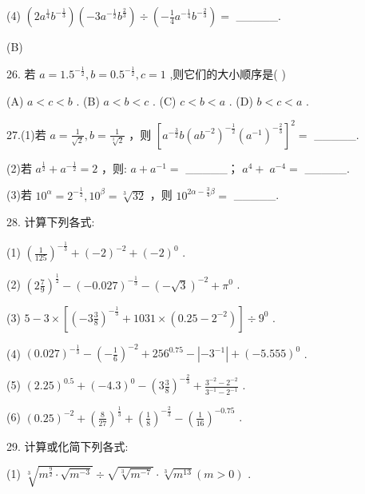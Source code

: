 \documentclass[10pt]{article}
\newcommand*\circled[1]{\tikz[baseline=(char.base)]{\node[shape=circle,draw,inner sep=1.5pt] (char) {\small #1};}}
\begin{document}
(4) \(\left( {{2{a}^{\frac{1}{4}}}{b}^{-\frac{1}{3}}}\right) \left( {-3{a}^{-\frac{1}{2}}{b}^{\frac{2}{3}}}\right)  \div  \left( {-\frac{1}{4}{a}^{-\frac{1}{4}}{b}^{-\frac{2}{3}}}\right)  =\) \_\_\_\_\_.

(B)

26. 若 \(a = {1.5}^{-\frac{1}{2}},b = {0.5}^{-\frac{1}{2}},c = 1\) ,则它们的大小顺序是( )

(A) \(a < c < b\) . (B) \(a < b < c\) . (C) \(c < b < a\) . (D) \(b < c < a\) .

27.(1)若 \(a = \frac{1}{\sqrt{2}},b = \frac{1}{\sqrt[3]{2}}\) ，则 \({\left\lbrack  {a}^{-\frac{3}{2}}b{\left( a{b}^{-2}\right) }^{-\frac{1}{2}}{\left( {a}^{-1}\right) }^{-\frac{2}{3}}\right\rbrack  }^{2} =\) \_\_\_\_\_.

(2)若 \({a}^{\frac{1}{2}} + {a}^{-\frac{1}{2}} = 2\) ，则: \circled{1}  \(a + {a}^{-1} =\) \_\_\_\_\_； \circled{3}  \({a}^{4} + \; {a}^{-4} =\) \_\_\_\_\_.

(3)若 \({10}^{\alpha } = {2}^{-\frac{1}{2}},{10}^{\beta } = \sqrt[3]{32}\) ，则 \({10}^{{2\alpha } - \frac{3}{4}\beta } =\) \_\_\_\_\_.

28. 计算下列各式:

(1) \({\left( \frac{1}{125}\right) }^{-\frac{1}{3}} + {\left( -2\right) }^{-2} + {\left( -2\right) }^{0}\) .

(2) \({\left( 2\frac{7}{9}\right) }^{\frac{1}{2}} - {\left( -{0.027}\right) }^{-\frac{1}{3}} - {\left( -\sqrt{3}\right) }^{-2} + {\pi }^{0}\) .

(3) \(5 - 3 \times  \left\lbrack  {{\left( -3\frac{3}{8}\right) }^{-\frac{1}{3}} + {1031} \times  \left( {{0.25} - {2}^{-2}}\right) }\right\rbrack   \div  {9}^{0}\) .

(4) \({\left( {0.027}\right) }^{-\frac{1}{3}} - {\left( -\frac{1}{6}\right) }^{-2} + {256}^{0.75} - \left| {-{3}^{-1}}\right|  + {\left( -{5.555}\right) }^{0}\) .

(5) \({\left( {2.25}\right) }^{0.5} + {\left( -{4.3}\right) }^{0} - {\left( 3\frac{3}{8}\right) }^{-\frac{2}{3}} + \frac{{3}^{-2} - {2}^{-2}}{{3}^{-1} - {2}^{-1}}\) .

(6) \({\left( {0.25}\right) }^{-2} + {\left( \frac{8}{27}\right) }^{\frac{1}{3}} + {\left( \frac{1}{8}\right) }^{-\frac{2}{3}} - {\left( \frac{1}{16}\right) }^{-{0.75}}\) .

29. 计算或化简下列各式:

(1) \(\sqrt[3]{{m}^{\frac{9}{2}} \cdot  \sqrt{{m}^{-3}}} \div  \sqrt{\sqrt[3]{{m}^{-7}}} \cdot  \sqrt[3]{{m}^{13}}\left( {m > 0}\right)\) .
\end{document}
